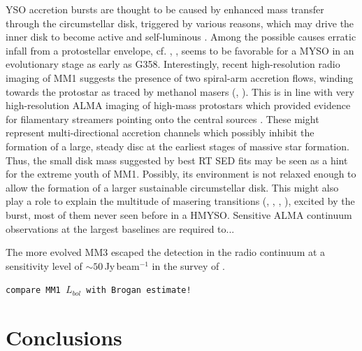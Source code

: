 \documentclass[longauth,usenatbib]{aa}
\begin{document}
YSO accretion bursts are thought to be caused by enhanced mass transfer through the circumstellar disk, triggered by various reasons, which may drive the inner disk to become active and self-luminous . Among the possible causes erratic infall from a protostellar envelope, cf. , ,  seems to be favorable for a MYSO in an evolutionary stage as early as G358. Interestingly, recent high-resolution radio imaging of MM1 suggests the presence of two spiral-arm accretion flows, winding towards the protostar as traced by methanol masers (, ). This is in line with very high-resolution ALMA imaging of high-mass protostars which provided evidence for filamentary streamers pointing onto the central sources . These might represent multi-directional accretion channels which possibly inhibit the formation of a large, steady disc at the earliest stages of massive star formation. Thus, the small disk mass suggested by best RT SED fits may be seen as a hint for the extreme youth of MM1. Possibly, its environment is not relaxed enough to allow the formation of a larger sustainable circumstellar disk. This might also play a role to 
explain the multitude of masering transitions (, , , ), excited by the burst, most of them never seen before in a HMYSO. Sensitive ALMA continuum observations at the largest baselines are required to...

The more evolved MM3 escaped the detection in the radio continuum at a sensitivity level of $\sim50$\,Jy\,beam$^{-1}$ in the survey of .

{\tt compare MM1 $L_{bol}$ with Brogan estimate!}


\section{Conclusions}\label{conc}
\end{document}
